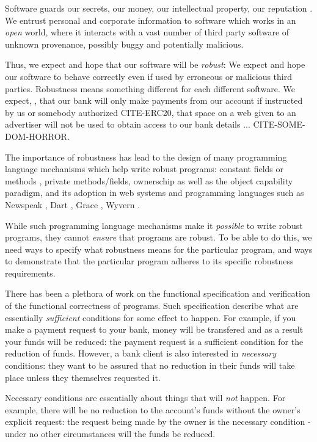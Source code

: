 Software guards our secrets, our money, our intellectual property,
our reputation \cite{covfefe}.  We entrust personal and
corporate information to software which works in an \emph{open} world, 
where  it interacts with a vast number of
third party software of unknown provenance, possibly buggy and potentially malicious.

Thus, we expect and hope that our software will be \emph{robust}:
We expect and hope our software to behave correctly even if  used 
by erroneous or malicious third parties. Robustness means 
something different for each different software.
 We expect, \eg, that our bank will only make payments 
from our account if instructed by us or somebody authorized CITE-ERC20,
that  space on a web given to an advertiser will not be used
to obtain access to our bank details ... CITE-SOME-DOM-HORROR.

The importance of robustness has lead to the design of many programming
language mechanisms which help write robust programs:
constant fields or methods \cite{...}, private methods/fields\cite{...}, ownerschip\cite{...}
as well as the object capability paradigm\cite{millerPhDThesis},
and its adoption in  web systems
\cite{CapJavaHayesAPLAS17,CapNetSocc17Eide,DOCaT14} and programming languages such as Newspeak
\cite{newspeak17}, Dart \cite{dart15}, Grace \cite{grace,graceClasses}, Wyvern \cite{wyverncapabilities}.

While such programming language mechanisms make it \textit{possible} to write robust
programs, they cannot \textit{ensure} that programs are robust. 
To be able to do this, we need ways to specify what robustness means for the 
particular program, and ways to demonstrate that the particular program 
adheres to its specific robustness requirements.

There has been a plethora of work on the functional specification and verification of the
functional correctness of programs. Such specification describe what are
essentially \emph{sufficient} conditions for some
effect to happen. For example, if you make a payment request to your bank, money will be transfered
and as a result your funds will be reduced: the payment request is a sufficient condition for the
reduction of funds. However, a bank client is also interested in \emph{necessary} conditions:
they want to be assured that no reduction in their funds will take place unless they themselves
requested it.

Necessary conditions are essentially about things that will  \emph{not} happen. For example,
there  will be no reduction to the account's funds without the owner's explicit request: the request being made by
the owner is the necessary condition - under no other circumstances will the funds be reduced.

